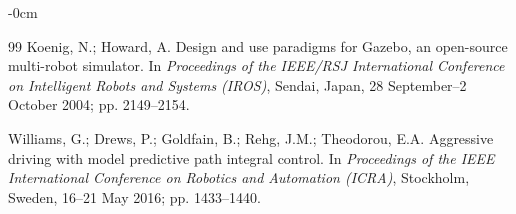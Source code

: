 \documentclass[sensors,article,submit,pdftex,moreauthors]{Definitions/mdpi}
\begin{document}
\begin{adjustwidth}{-\extralength}{0cm}
\begin{thebibliography}{99}
Koenig, N.; Howard, A. Design and use paradigms for Gazebo, an open-source multi-robot simulator. In \textit{Proceedings of the IEEE/RSJ International Conference on Intelligent Robots and Systems (IROS)}, Sendai, Japan, 28 September--2 October 2004; pp. 2149--2154.

Williams, G.; Drews, P.; Goldfain, B.; Rehg, J.M.; Theodorou, E.A. Aggressive driving with model predictive path integral control. In \textit{Proceedings of the IEEE International Conference on Robotics and Automation (ICRA)}, Stockholm, Sweden, 16--21 May 2016; pp. 1433--1440.

\end{thebibliography}

%


\PublishersNote{}
\end{adjustwidth}
\end{document}
